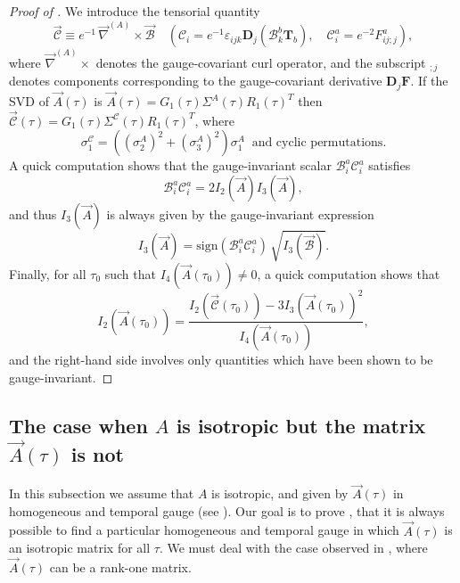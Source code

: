 \begin{proof}[Proof of ]
 We introduce the tensorial quantity 
\[
\vec{\mathcal{C}}\equiv e^{-1}\,\vec{\nabla}^{(A)}\!\times\vec{\mathcal{B}}\quad\left(\mathcal{C}_{i}=e^{-1}\varepsilon_{ijk}\mathbf{D}_{j}\left(\mathcal{B}_{k}^{b}\mathbf{T}_{b}\right),\quad\mathcal{C}_{i}^{a}=e^{-2}F_{ij;j}^{a}\right),
\]
 where $\vec{\nabla}^{(A)}\times$ denotes the gauge-covariant curl operator, and the subscript $_{;j}$ denotes components corresponding to the gauge-covariant derivative $\mathbf{D}_{j}\mathbf{F}$. If the SVD of $\vec{A}(\tau)$ is $\vec{A}(\tau)=G_{1}(\tau)\Sigma^{A}(\tau)R_{1}(\tau)^{T}$ then $\vec{\mathcal{C}}(\tau)=G_{1}(\tau)\Sigma^{\mathcal{C}}(\tau)R_{1}(\tau)^{T}$, where 
\[
\sigma_{1}^{\mathcal{C}}=\left(\left(\sigma_{2}^{A}\right)^{2}+\left(\sigma_{3}^{A}\right)^{2}\right)\sigma_{1}^{A}\ \textrm{ and cyclic permutations}.
\]
A quick computation shows that the gauge-invariant scalar $\mathcal{B}_{i}^{a}\mathcal{C}_{i}^{a}$ satisfies 
\[
\mathcal{B}_{i}^{a}\mathcal{C}_{i}^{a}=2I_{2}(\vec{A})I_{3}(\vec{A}),
\]
 and thus $I_{3}(\vec{A})$ is always given by the gauge-invariant expression 
\[
I_{3}(\vec{A})=\mathrm{sign}\left(\mathcal{B}_{i}^{a}\mathcal{C}_{i}^{a}\right)\,\sqrt{I_{3}(\vec{\mathcal{B}})}.
\]
 Finally, for all $\tau_{0}$ such that $I_{4}(\vec{A}(\tau_{0}))\neq0$, a quick computation shows that 
\[
I_{2}(\vec{A}(\tau_{0}))=\frac{I_{2}(\vec{\mathcal{C}}(\tau_{0}))-3I_{3}(\vec{A}(\tau_{0}))^{2}}{I_{4}(\vec{A}(\tau_{0}))},
\]
 and the right-hand side involves only quantities which have been shown to be gauge-invariant. 
\end{proof}

\subsection{\label{app:isotrop-proof}The case when $A$ is isotropic but the matrix $\vec{A}(\tau)$ is not }

In this subsection we assume that $A$ is isotropic, and given by $\vec{A}(\tau)$ in homogeneous and temporal gauge (see ). Our goal is to prove , that it is always possible to find a particular homogeneous and temporal gauge in which $\vec{A}(\tau)$ is an isotropic matrix for all $\tau$. We must deal with the case observed in , where $\vec{A}(\tau)$ can be a rank-one matrix. 

